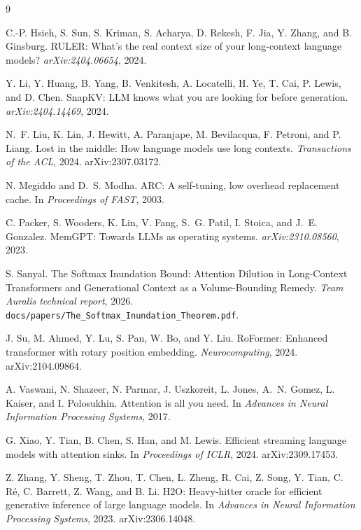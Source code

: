 \documentclass[11pt,a4paper]{article}
\theoremstyle{plain}
\theoremstyle{definition}
\theoremstyle{remark}
\begin{document}
\begin{thebibliography}{9}

C.-P. Hsieh, S. Sun, S. Kriman, S. Acharya, D. Rekesh, F. Jia, Y. Zhang, and
B. Ginsburg.
\newblock RULER: What's the real context size of your long-context language
  models?
\newblock \emph{arXiv:2404.06654}, 2024.

Y. Li, Y. Huang, B. Yang, B. Venkitesh, A. Locatelli, H. Ye, T. Cai, P. Lewis,
  and D. Chen.
\newblock SnapKV: LLM knows what you are looking for before generation.
\newblock \emph{arXiv:2404.14469}, 2024.

N.~F. Liu, K. Lin, J. Hewitt, A. Paranjape, M. Bevilacqua, F. Petroni, and
P. Liang.
\newblock Lost in the middle: How language models use long contexts.
\newblock \emph{Transactions of the ACL}, 2024. arXiv:2307.03172.

N. Megiddo and D.~S. Modha.
\newblock ARC: A self-tuning, low overhead replacement cache.
\newblock In \emph{Proceedings of FAST}, 2003.

C. Packer, S. Wooders, K. Lin, V. Fang, S.~G. Patil, I. Stoica, and J.~E.
  Gonzalez.
\newblock MemGPT: Towards LLMs as operating systems.
\newblock \emph{arXiv:2310.08560}, 2023.

S. Sanyal.
\newblock The Softmax Inundation Bound: Attention Dilution in Long-Context
  Transformers and Generational Context as a Volume-Bounding Remedy.
\newblock \emph{Team Auralis technical report}, 2026.
  \texttt{docs/papers/The\_Softmax\_Inundation\_Theorem.pdf}.

J. Su, M. Ahmed, Y. Lu, S. Pan, W. Bo, and Y. Liu.
\newblock RoFormer: Enhanced transformer with rotary position embedding.
\newblock \emph{Neurocomputing}, 2024. arXiv:2104.09864.

A. Vaswani, N. Shazeer, N. Parmar, J. Uszkoreit, L. Jones, A.~N. Gomez,
  L. Kaiser, and I. Polosukhin.
\newblock Attention is all you need.
\newblock In \emph{Advances in Neural Information Processing Systems}, 2017.

G. Xiao, Y. Tian, B. Chen, S. Han, and M. Lewis.
\newblock Efficient streaming language models with attention sinks.
\newblock In \emph{Proceedings of ICLR}, 2024. arXiv:2309.17453.

Z. Zhang, Y. Sheng, T. Zhou, T. Chen, L. Zheng, R. Cai, Z. Song, Y. Tian,
  C. R\'e, C. Barrett, Z. Wang, and B. Li.
\newblock H2O: Heavy-hitter oracle for efficient generative inference of large
  language models.
\newblock In \emph{Advances in Neural Information Processing Systems}, 2023.
  arXiv:2306.14048.

\end{thebibliography}
\end{document}
